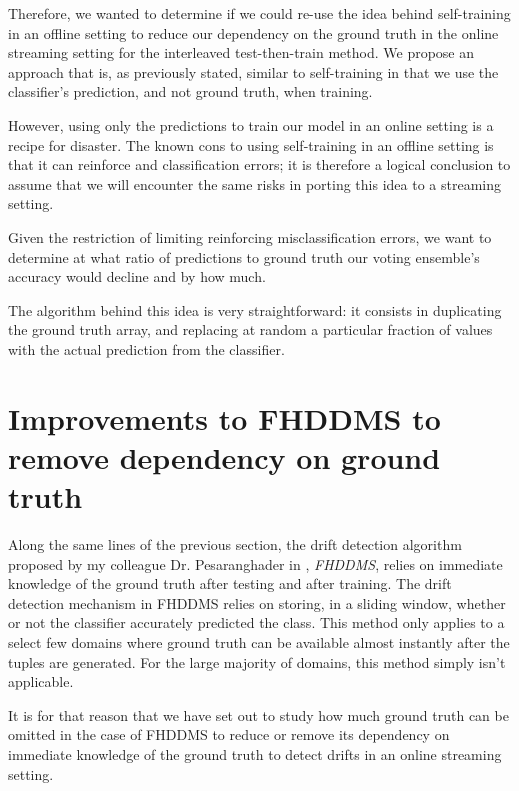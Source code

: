 Therefore, we wanted to determine if we could re-use the idea behind self-training in an offline setting to reduce our dependency on the ground truth in the online streaming setting for the interleaved test-then-train method. We propose an approach that is, as previously stated, similar to self-training in that we use the classifier's prediction, and not ground truth, when training.

However, using only the predictions to train our model in an online setting is a recipe for disaster. The known cons to using self-training in an offline setting is that it can reinforce and classification errors; it is therefore a logical conclusion to assume that we will encounter the same risks in porting this idea to a streaming setting.

Given the restriction of limiting reinforcing misclassification errors, we want to determine at what ratio of predictions to ground truth our voting ensemble's accuracy would decline and by how much.

The algorithm behind this idea is very straightforward: it consists in duplicating the ground truth array, and replacing at random a particular fraction of values with the actual prediction from the classifier.


\section{Improvements to FHDDMS to remove dependency on ground truth}

Along the same lines of the previous section, the drift detection algorithm proposed by my colleague Dr. Pesaranghader in \cite{pesaranghader2016fast}, \textit{FHDDMS}, relies on immediate knowledge of the ground truth after testing and after training. The drift detection mechanism in FHDDMS relies on storing, in a sliding window, whether or not the classifier accurately predicted the class. This method only applies to a select few domains where ground truth can be available almost instantly after the tuples are generated. For the large majority of domains, this method simply isn't applicable.

It is for that reason that we have set out to study how much ground truth can be omitted in the case of FHDDMS to reduce or remove its dependency on immediate knowledge of the ground truth to detect drifts in an online streaming setting.

